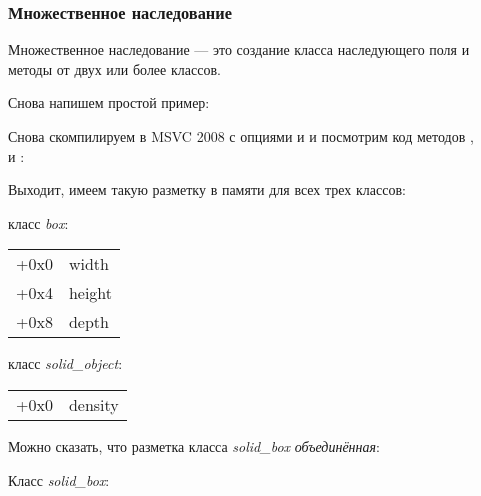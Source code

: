\subsubsection{Множественное наследование}

Множественное наследование --- это создание класса наследующего поля и методы от двух или более классов.


Снова напишем простой пример:



Снова скомпилируем в MSVC 2008 с опциями \Ox и \Obzero и посмотрим код методов ,\\
 и :








Выходит, имеем такую разметку в памяти для всех трех классов:


класс \emph{box}:

\begin{center}
\begin{tabular}{ | l | l | }
\hline
  \tableheader{} \\
\hline
  +0x0 & width \\
\hline
  +0x4 & height \\
\hline
  +0x8 & depth \\
\hline
\end{tabular}
\end{center}

класс \emph{solid\_object}:

\begin{center}
\begin{tabular}{ | l | l | }
\hline
  \tableheader{} \\
\hline
  +0x0 & density \\
\hline
\end{tabular}
\end{center}

Можно сказать, что разметка класса \emph{solid\_box} \emph{объединённая}:


Класс \emph{solid\_box}:

